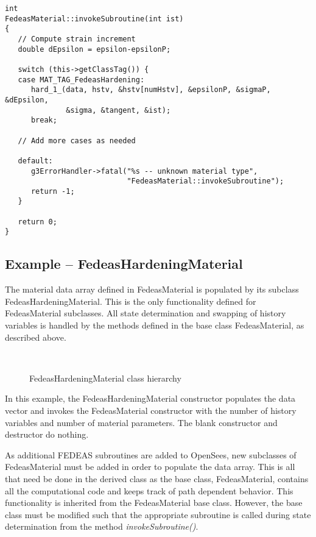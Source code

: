 \documentclass[12pt]{article}
\begin{document}
{\sf\small
\begin{verbatim}
int
FedeasMaterial::invokeSubroutine(int ist)
{
   // Compute strain increment
   double dEpsilon = epsilon-epsilonP;
     
   switch (this->getClassTag()) {
   case MAT_TAG_FedeasHardening:
      hard_1_(data, hstv, &hstv[numHstv], &epsilonP, &sigmaP, &dEpsilon, 
              &sigma, &tangent, &ist);
      break;
       
   // Add more cases as needed

   default:
      g3ErrorHandler->fatal("%s -- unknown material type",
                            "FedeasMaterial::invokeSubroutine");
      return -1;
   }
     
   return 0;
}
\end{verbatim}
}

\subsection{Example -- FedeasHardeningMaterial}
The material data array defined in FedeasMaterial is populated by its subclass
FedeasHardeningMaterial. This is the only functionality defined for FedeasMaterial
subclasses. All state determination and swapping of history variables is handled
by the methods defined in the base class FedeasMaterial, as described above.

\begin{figure}[htpb]
\begin{center}
\leavevmode
\hbox{%
}
\end{center}
\caption{FedeasHardeningMaterial class hierarchy}
\label{fig:FedeasHardening}
\end{figure}

In this example, the FedeasHardeningMaterial constructor populates the data vector
and invokes the FedeasMaterial constructor with the number of history variables and
number of material parameters. The blank constructor and destructor do nothing.

As additional FEDEAS subroutines are added to OpenSees, new subclasses of FedeasMaterial
must be added in order to populate the data array. This is all that need
be done in the derived class as the base class, FedeasMaterial, contains all the 
computational code and keeps track of path dependent behavior. This functionality is
inherited from the FedeasMaterial base class. However, the base class 
must be modified such that the appropriate
subroutine is called during state determination from the method {\em invokeSubroutine()}.
\end{document}
